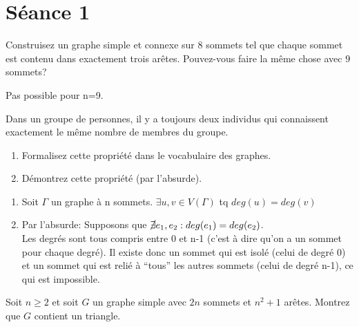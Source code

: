 
\section{Séance 1}

\begin{exo}
Construisez un graphe simple et connexe sur $8$ sommets tel que chaque sommet est contenu dans exactement trois ar\^etes. Pouvez-vous faire la m\^eme chose avec $9$ sommets?
\end{exo}

\begin{figure}[!h]
\centering
\scalebox{.825}{}
\end{figure}

Pas possible pour n=9.


\begin{exo}
Dans un groupe de personnes, il y a toujours deux individus qui connaissent exactement le m\^eme nombre de membres du groupe.
\begin{enumerate}
\item Formalisez cette propri\'et\'e dans le vocabulaire des graphes.
\item D\'emontrez cette propri\'et\'e (par l'absurde).
\end{enumerate}
\end{exo}

\begin{enumerate}
\item Soit $\Gamma$ un graphe à n sommets. $\exists u,v \in V(\Gamma)$ tq $deg(u)=deg(v)$
\item Par l'absurde: Supposons que $\cancel{\exists}{} e_{1}, e_{2}: deg(e_{1}) = deg(e_{2})$. \\

Les degrés sont tous compris entre 0 et n-1 (c'est à dire qu'on a un sommet pour chaque degré). Il existe donc un sommet qui est isolé (celui de degré 0) et un sommet qui est relié à ``tous'' les autres sommets (celui de degré n-1), ce qui est impossible.
\end{enumerate}


\begin{exo}
Soit $n\geq 2$ et soit $G$ un graphe simple avec $2n$ sommets et $n^2+1$ ar\^etes. Montrez que $G$ contient un triangle.
\end{exo}


